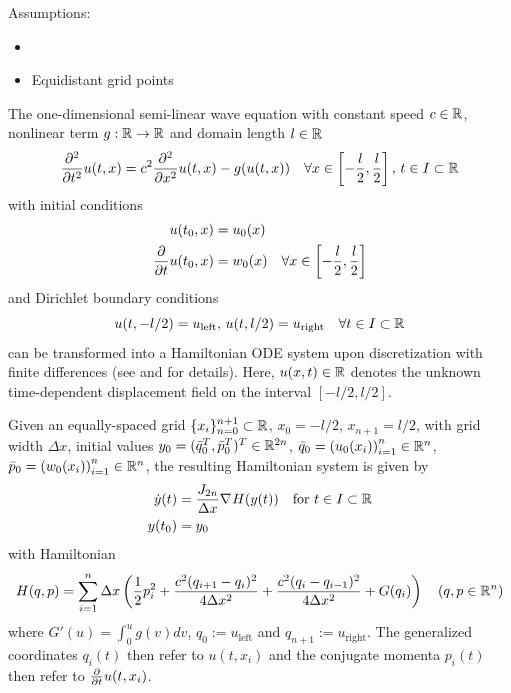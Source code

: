 \documentclass[twoside,a4paper]{article}
\begin{document}

Assumptions:
\begin{itemize}
	\item {}
	\item Equidistant grid points
\end{itemize}


The one-dimensional semi-linear wave equation with constant speed $c \in \mathbb{R}$, nonlinear term 
$g : \mathbb{R} \to \mathbb{R}$ and domain length $l \in \mathbb{R}$
\begin{equation*}
	\frac{\partial^2}{\partial t^2} u(t,x) = 
	c^2 \frac{\partial^2}{\partial x^2} u(t,x) - g(u(t,x)) 
	\quad \forall x \in \left[ -\frac{l}{2},\frac{l}{2} \right], 
	\, t \in I \subset \mathbb{R}
\end{equation*}
with initial conditions
\begin{align*}
	u(t_0,x) &= u_0(x) \\
	\frac{\partial }{\partial t} u(t_0,x) &= w_0(x) \quad \forall x \in \left[ -\frac{l}{2},\frac{l}{2} \right]
\end{align*}
and Dirichlet boundary conditions
\begin{equation*}
	u(t,-l/2) = u_{\text{left}}, \, u(t,l/2) = u_{\text{right}} \quad \forall t \in I \subset \mathbb{R}
\end{equation*}
can be transformed into a Hamiltonian ODE system upon discretization with finite differences
(see \cite{2006ham_pde} and \cite{peng2016} for details). 
Here, $u(x,t) \in \mathbb{R}$ denotes the unknown time-dependent displacement field on the interval $[-l/2, l/2]$.

Given an equally-spaced grid $\{ x_i \}_{n=0}^{n+1} \subset \mathbb{R}$, $x_0 = -l/2$, $x_{n+1} = l/2$,
with grid width $\Delta x$,
initial values $y_0 = (\bar{q}_0^T, \bar{p}_0^T)^T \in \mathbb{R}^{2n}$, $\bar{q}_0 = \left( u_0(x_i) \right)_{i=1}^n \in \mathbb{R}^n$, 
$\bar{p}_0 = \left( w_0(x_i) \right)_{i=1}^n \in \mathbb{R}^n$,
the resulting Hamiltonian system is given by
\begin{align*}
	\dot{y}(t) &= \frac{J_{2n}}{\Delta x} \nabla_{}{H}(y(t)) \quad \text{for } t \in I \subset \mathbb{R} \\
	y(t_0) &= y_0
\end{align*}
with Hamiltonian
\begin{equation*}
	H(q,p) = \sum_{i=1}^n \Delta x \left( 
	\frac{1}{2} p_i^2 + \frac{c^2 (q_{i+1} - q_i)^2}{4 \Delta x^2} 
	+ \frac{c^2 (q_i - q_{i-1})^2}{4 \Delta x^2} + G(q_i)
	\right)
	\quad (q,p \in \mathbb{R}^n)
\end{equation*}
where $G'(u) = \int_0^u g(v) dv$, $q_0 := u_{\text{left}}$ and $q_{n+1} := u_{\text{right}}$.
The generalized coordinates $q_i(t)$ then refer to $u(t,x_i)$ and 
the conjugate momenta $p_i(t)$ then refer to $\frac{\partial }{\partial t} u(t,x_i)$.
\end{document}
